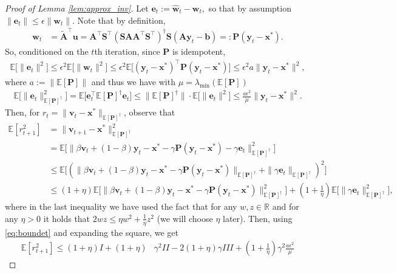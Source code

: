 \documentclass[11pt]{article}
\let\origtop\top
\renewcommand\top{{\scriptscriptstyle{\origtop}}}
\def\x{{\mathbf x}}
\def\w{{\mathbf w}}
\def\e{{\mathbf e}}
\def\v{{\mathbf v}}
\def\u{{\mathbf u}}
\def\y{{\mathbf y}}
\def\b{{\mathbf b}}
\def\A{{\mathbf A}}
\def\S{{\mathbf S}}
\def\P{{\mathbf P}}
\def\E{{\mathds E}}
\def\R{{\mathbf R}}
\def\R{{\mathds R}}
\begin{document}
\begin{proof}[Proof of Lemma \ref{lem:approx_inv}]
    Let $\e_t := \hat\w_t-\w_t,$ so that by assumption $\|\e_t\| \leq \epsilon\|\w_t\|$. Note that by definition, 
    \begin{align*}
    \w_t &= \tilde{\A}^\top \u = \A^\top\S^\top(\S\A\A^\top\S^\top)^\dagger\S(\A\y_t - \b) =: \P(\y_t - \x^*).
     \end{align*} 
     So, conditioned on the $t$th iteration, since $\P$ is idempotent,
     \begin{align}\label{eq:boundet1}
      \E\big[\|\e_t\|^2\big] \leq \epsilon^2\E \big[\|\w_t\|^2 \big] \leq \epsilon^2 \E \big[(\y_t-\x^*)^\top \P(\y_t-\x^*)\big] \le \epsilon^2 a \|\y_t-\x^*\|^2, 
      \end{align}
      where $a := \|\E[\P]\|$ and thus we have with $\mu = \lambda_{\min}(\E[\P])$
      \begin{align}\label{eq:boundet}
      \E \big[\|\e_t\|_{\E[\P]^\dagger}^2 \big] = \E \big[\e_t^\top\E[\P]^\dagger\e_t \big] \leq \|\E[\P]^\dagger\|\cdot
          \E \big[\|\e_t\|^2 \big] \leq \frac{a \epsilon^2}{\mu}
          \|\y_t-\x^*\|^2.
      \end{align}
      Then, for $r_t = \|\v_t - \x^*\|_{\E[\P]^\dagger}$, observe that
      \begin{align*}
          \E [r_{t+1}^2] &= \|\v_{t+1} - \x^*\|^2_{\E[\P]^\dagger}\\
          &= \E
          \big[\|\beta\v_t + (1-\beta)\y_t - \x^* - \gamma\P(\y_t-\x^*) - \gamma\e_t\|^2_{\E[\P]^\dagger} \big]\\
          &\leq 
         \E \big[\left(\|\beta\v_t + (1-\beta)\y_t - \x^* - \gamma\P(\y_t-\x^*)\|_{\E[\P]^\dagger} + \|\gamma\e_t\|_{\E[\P]^\dagger}\right)^2 \big]\\
          &\leq (1+\eta) \E \big[ \|\beta\v_t + (1-\beta)\y_t - \x^* - \gamma\P(\y_t-\x^*)\|_{\E[\P]^\dagger}^2 \big] +          
          \left(1+\frac{1}{\eta}\right)\E \big[\|\gamma\e_t\|_{\E[\P]^\dagger}^2 \big],
      \end{align*}
      where in the last inequality we have used the fact that for any $w,z\in\R$ and for any $\eta > 0$ it holds that $2wz\leq \eta w^2 +\frac{1}{\eta}z^2 $ (we will choose $\eta$ later). Then, using \eqref{eq:boundet} and expanding the square, we get
       \begin{align}\label{eq:theIs}
          \E [r_{t+1}^2] \le  (1+\eta)I + (1+\eta)&\gamma^2II - 2(1+\eta)\gamma III + \left(1+\frac{1}{\eta}\right)\gamma^2\frac{a \epsilon^2}{\mu}

\end{align}
\end{proof}
\end{document}
